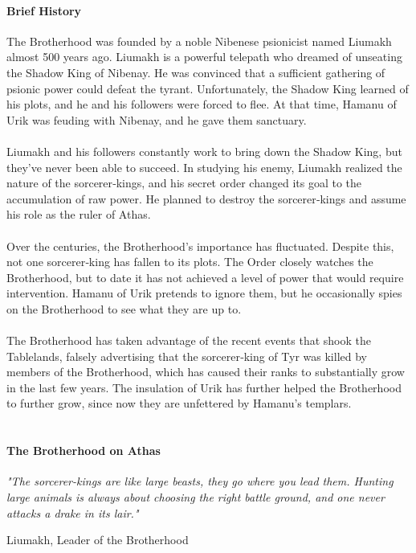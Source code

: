 \begin{multicols}{2}
\paragraph{Brief History}
The Brotherhood was founded by a noble Nibenese
psionicist named Liumakh almost 500 years ago. Liumakh
is a powerful telepath who dreamed of unseating the
Shadow King of Nibenay. He was convinced that a
sufficient gathering of psionic power could defeat the
tyrant. Unfortunately, the Shadow King learned of his
plots, and he and his followers were forced to flee. At that
time, Hamanu of Urik was feuding with Nibenay, and he
gave them sanctuary.\\
\\
Liumakh and his followers constantly work to bring
down the Shadow King, but they've never been able to
succeed. In studying his enemy, Liumakh realized the
nature of the sorcerer‐kings, and his secret order changed
its goal to the accumulation of raw power. He planned to
destroy the sorcerer‐kings and assume his role as the ruler
of Athas.\\
\\
Over the centuries, the Brotherhood's importance has
fluctuated. Despite this, not one sorcerer‐king has fallen to
its plots. The Order closely watches the Brotherhood, but
to date it has not achieved a level of power that would
require intervention. Hamanu of Urik pretends to ignore
them, but he occasionally spies on the Brotherhood to see
what they are up to.\\
\\
The Brotherhood has taken advantage of the recent
events that shook the Tablelands, falsely advertising that
the sorcerer‐king of Tyr was killed by
members of the Brotherhood, which has caused their
ranks to substantially grow in the last few years. The
insulation of Urik has further helped the Brotherhood to
further grow, since now they are unfettered by Hamanu's
templars.\\
\\
\paragraph{The Brotherhood on Athas}
\epigraph{\textit{
"The sorcerer-kings are like large beasts, they go where you
lead them. Hunting large animals is always about choosing
the right battle ground, and one never attacks a drake in
its lair." }}
{ Liumakh, Leader of the Brotherhood }


\end{multicols}

